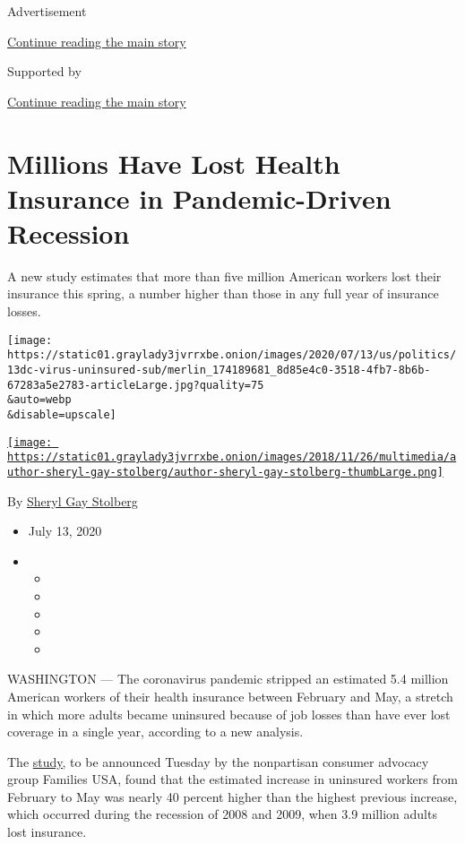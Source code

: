 Advertisement

\protect\hyperlink{after-top}{Continue reading the main story}

Supported by

\protect\hyperlink{after-sponsor}{Continue reading the main story}

\hypertarget{millions-have-lost-health-insurance-in-pandemic-driven-recession}{%
\section{Millions Have Lost Health Insurance in Pandemic-Driven
Recession}\label{millions-have-lost-health-insurance-in-pandemic-driven-recession}}

A new study estimates that more than five million American workers lost
their insurance this spring, a number higher than those in any full year
of insurance losses.

\texttt{[image: https://static01.graylady3jvrrxbe.onion/images/2020/07/13/us/politics/13dc-virus-uninsured-sub/merlin\_174189681\_8d85e4c0-3518-4fb7-8b6b-67283a5e2783-articleLarge.jpg?quality=75\\\&auto=webp\\\&disable=upscale]}

\href{https://www.nytimes3xbfgragh.onion/by/sheryl-gay-stolberg}{\texttt{[image: https://static01.graylady3jvrrxbe.onion/images/2018/11/26/multimedia/author-sheryl-gay-stolberg/author-sheryl-gay-stolberg-thumbLarge.png]}}

By
\href{https://www.nytimes3xbfgragh.onion/by/sheryl-gay-stolberg}{Sheryl
Gay Stolberg}

\begin{itemize}
\item
  July 13, 2020
\item
  \begin{itemize}
  \item
  \item
  \item
  \item
  \item
  \end{itemize}
\end{itemize}

WASHINGTON --- The coronavirus pandemic stripped an estimated 5.4
million American workers of their health insurance between February and
May, a stretch in which more adults became uninsured because of job
losses than have ever lost coverage in a single year, according to a new
analysis.

The
\href{https://www.familiesusa.org/resources/the-covid-19-pandemic-and-resulting-economic-crash-have-caused-the-greatest-health-insurance-losses-in-american-history/}{study,}
to be announced Tuesday by the nonpartisan consumer advocacy group
Families USA, found that the estimated increase in uninsured workers
from February to May was nearly 40 percent higher than the highest
previous increase, which occurred during the recession of 2008 and 2009,
when 3.9 million adults lost insurance.


